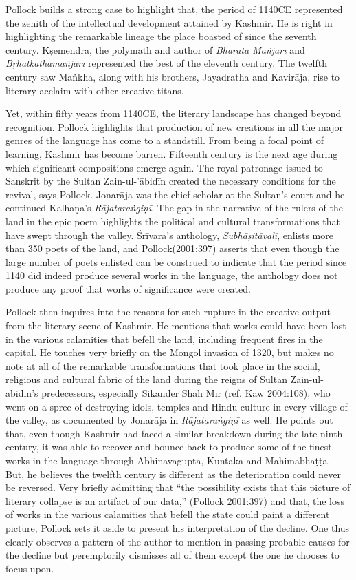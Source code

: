 Pollock builds a strong case to highlight that, the period of 1140CE represented the zenith of the intellectual development attained by Kashmir. He is right in highlighting the remarkable lineage the place boasted of since the seventh century. Kṣemendra, the polymath and author of {\sl Bhārata Mañjarī} and {\sl Bṛhatkathāmañjarī} represented the best of the eleventh century. The twelfth century saw Maṅkha, along with his brothers, Jayadratha and Kavirāja, rise to literary acclaim with other creative titans.

Yet, within fifty years from 1140CE, the literary landscape has changed beyond recognition. Pollock highlights that production of new creations in all the major genres of the language has come to a standstill. From being a focal point of learning, Kashmir has become barren. Fifteenth century is the next age during which significant compositions emerge again. The royal patronage issued to Sanskrit by the Sultan Zain-ul-’ābidīn created the necessary conditions for the revival, says Pollock. Jonarāja was the chief scholar at the Sultan’s court and he continued Kalhaṇa’s {\sl Rājataraṅgiṇī}. The gap in the narrative of the rulers of the land in the epic poem highlights the political and cultural transformations that have swept through the valley. Śrīvara’s anthology, {\sl Subhāṣitāvalī}, enlists more than 350 poets of the land, and Pollock(2001:397) asserts that even though the large number of poets enlisted can be construed to indicate that the period since 1140 did indeed produce several works in the language, the anthology does not produce any proof that works of significance were created.

Pollock then inquires into the reasons for such rupture in the creative output from the literary scene of Kashmir. He mentions that works could have been lost in the various calamities that befell the land, including frequent fires in the capital. He touches very briefly on the Mongol invasion of 1320, but makes no note at all of the remarkable transformations that took place in the social, religious and cultural fabric of the land during the reigns of Sultān Zain-ul-ābidīn’s predecessors, especially Sikander Shāh Mīr (ref. Kaw 2004:108), who went on a spree of destroying idols, temples and Hindu culture in every village of the valley, as documented by Jonarāja in {\sl Rājataraṅgiṇī} as well. He points out that, even though Kashmir had faced a similar breakdown during the late ninth century, it was able to recover and bounce back to produce some of the finest works in the language through Abhinavagupta, Kuntaka and Mahimabhaṭṭa. But, he believes the twelfth century is different as the deterioration could never be reversed. Very briefly admitting that “the possibility exists that this picture of literary collapse is an artifact of our data,” (Pollock 2001:397) and that, the loss of works in the various calamities that befell the state could paint a different picture, Pollock sets it aside to present his interpretation of the decline. One thus clearly observes a pattern of the author to mention in passing probable causes for the decline but peremptorily dismisses all of them except the one he chooses to focus upon.

